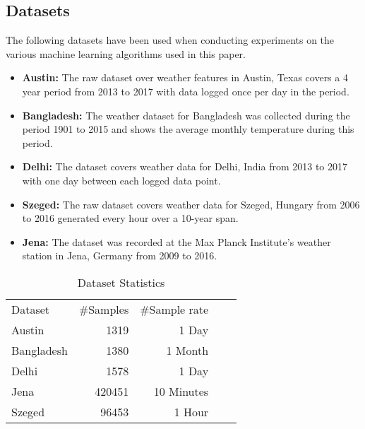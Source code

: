 \subsection{Datasets}
The following datasets have been used when conducting experiments on the various machine learning algorithms used in this paper.
\begin{itemize}
    \item \textbf{Austin:} The raw dataset over weather features in Austin, Texas covers a 4 year period from 2013 to 2017 with data logged once per day in the period.
    \item \textbf{Bangladesh:} The weather dataset for Bangladesh was collected during the period 1901 to 2015 and shows the average monthly temperature during this period. 
    \item \textbf{Delhi:} The dataset covers weather data for Delhi, India from 2013 to 2017 with one day between each logged data point.
    \item \textbf{Szeged:} The raw dataset covers weather data for Szeged, Hungary from 2006 to 2016 generated every hour over a 10-year span.
    \item \textbf{Jena:} The dataset was recorded at the Max Planck Institute's weather station in Jena, Germany from 2009 to 2016.
\end{itemize}

\begin{table*}[!ht]
\centering
\caption {Dataset Statistics} \label{tab:DatasetTable}
\begin{tabular}{|l|r|r|ll}
\cline{1-3}
Dataset    & \multicolumn{1}{l|}{\#Samples} & \multicolumn{1}{l|}{\#Sample rate} &  &  \\ \cline{1-3}
Austin     & 1319                           & 1 Day                              &  &  \\ \cline{1-3}
Bangladesh & 1380                           & 1 Month                            &  &  \\ \cline{1-3}
Delhi      & 1578                           & 1 Day                              &  &  \\ \cline{1-3}
Jena       & 420451                         & 10 Minutes                         &  &  \\ \cline{1-3}
Szeged     & 96453                          & 1 Hour                             &  &  \\ \cline{1-3}
\end{tabular}
\end{table*}

